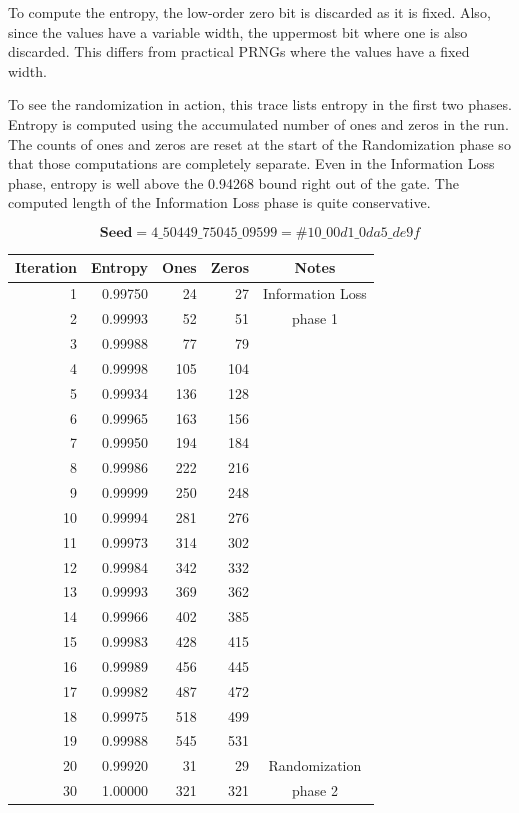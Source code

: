 \documentclass[letterpaper]{article}
\begin{document}
\begin{multicols}{2}
To compute the entropy, the low-order zero bit is discarded as it is fixed. Also, since the values have a variable width, the uppermost bit where one is also discarded. This differs from practical PRNGs where the values have a fixed width.

To see the randomization in action, this trace lists entropy in the first two phases. Entropy is computed using the accumulated number of ones and zeros in the run. The counts of ones and zeros are reset at the start of the Randomization phase so that those computations are completely separate. Even in the Information Loss phase, entropy is well above the 0.94268 bound right out of the gate. The computed length of the Information Loss phase is quite conservative.

\begin{center}
$$\textbf{Seed} = 4\_50449\_75045\_09599 = \#10\_00d1\_0da5\_de9f$$
\begin{tabular}{|r|r|r|r|c|}
\hline
\textbf{Iteration} & \textbf{Entropy} & \textbf{Ones} & \textbf{Zeros} & \textbf{Notes}\\
\hline
1 & 0.99750 & 24 & 27 & Information Loss \\
2 & 0.99993 & 52 & 51 & phase 1\\
3 & 0.99988 & 77 & 79 & \\
4 & 0.99998 & 105 & 104 & \\
5 & 0.99934 & 136 & 128 & \\
6 & 0.99965 & 163 & 156 & \\
7 & 0.99950 & 194 & 184 & \\
8 & 0.99986 & 222 & 216 & \\
9 & 0.99999 & 250 & 248 & \\
10 & 0.99994 & 281 & 276 & \\
11 & 0.99973 & 314 & 302 & \\
12 & 0.99984 & 342 & 332 & \\
13 & 0.99993 & 369 & 362 & \\
14 & 0.99966 & 402 & 385 & \\
15 & 0.99983 & 428 & 415 & \\
16 & 0.99989 & 456 & 445 & \\
17 & 0.99982 & 487 & 472 & \\
18 & 0.99975 & 518 & 499 & \\
19 & 0.99988 & 545 & 531 & \\
\hline
20 & 0.99920 & 31 & 29  & Randomization\\
30 & 1.00000 & 321 & 321 &  phase 2 \\

\end{tabular}
\end{center}
\end{multicols}
\end{document}
